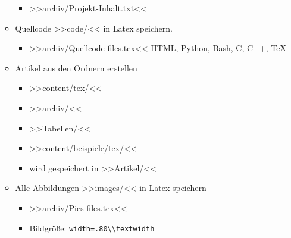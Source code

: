 \begin{enumerate}
\begin{itemize}
    \begin{itemize}
    \item
      >>archiv/Projekt-Inhalt.txt<<
    \end{itemize}
  \item
    Quellcode >>code/<< in Latex speichern.

    \begin{itemize}
    \item
      >>archiv/Quellcode-files.tex<< HTML, Python, Bash, C, C++, TeX
    \end{itemize}
  \item
    Artikel aus den Ordnern erstellen

    \begin{itemize}
    \item
      >>content/tex/<<
    \item
      >>archiv/<<
    \item
      >>Tabellen/<<
    \item
      >>content/beispiele/tex/<<
    \item
      wird gespeichert in >>Artikel/<<
    \end{itemize}
  \item
    Alle Abbildungen >>images/<< in Latex speichern

    \begin{itemize}
    \item
      >>archiv/Pics-files.tex<<
    \item
      Bildgröße: \verb|width=.80\\textwidth|
    \end{itemize}
  \end{itemize}
\end{enumerate}

